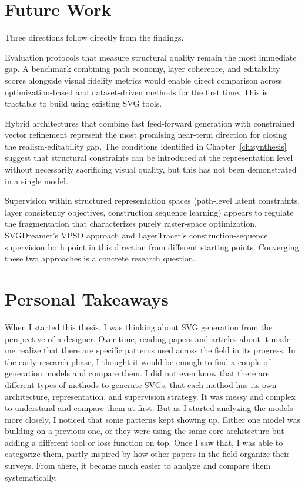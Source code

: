 \section{Future Work}

Three directions follow directly from the findings.

Evaluation protocols that measure structural 
quality remain the most immediate gap. A benchmark 
combining path economy, layer coherence, and editability 
scores alongside visual fidelity metrics would enable 
direct comparison across optimization-based and 
dataset-driven methods for the first time. This is 
tractable to build using existing SVG tools.

Hybrid architectures that combine fast feed-forward 
generation with constrained vector refinement represent 
the most promising near-term direction for closing the 
realism-editability gap. The conditions identified in 
Chapter~\ref{ch:synthesis} suggest that structural 
constraints can be introduced at the representation 
level without necessarily sacrificing visual quality, 
but this has not been demonstrated in a single model.

Supervision within structured representation spaces 
(path-level latent constraints, layer consistency 
objectives, construction sequence learning) appears to 
regulate the fragmentation that characterizes purely 
raster-space optimization. SVGDreamer's VPSD approach 
and LayerTracer's construction-sequence supervision 
both point in this direction from different starting 
points. Converging these two approaches is a concrete 
research question.




\section{Personal Takeaways}

When I started this thesis, I was thinking about SVG 
generation from the perspective of a designer. Over time, 
reading papers and articles about it made me realize that 
there are specific patterns used across the field in its progress.
In the early research phase, I 
thought it would be enough to find a couple of generation 
models and compare them. I did not even know that there 
are different types of methods to generate SVGs, that 
each method has its own architecture, representation, 
and supervision strategy. It was messy and complex to 
understand and compare them at first. 
But as I started analyzing the models more closely, I 
noticed that some patterns kept showing up. Either one 
model was building on a previous one, or they were using 
the same core architecture but adding a different tool 
or loss function on top. Once I saw that, I was able to 
categorize them, partly inspired by how other papers in 
the field organize their surveys. From there, it became 
much easier to analyze and compare them systematically.

